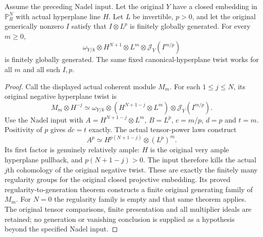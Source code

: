 \begin{proposition}
\label{prop:c0n-ordinary-uniform-generation}
\leanok
{}
Assume the preceding Nadel input.  Let the original $Y$ have a closed
embedding in $\mathbb P^N_R$ with actual hyperplane line $H$.  Let $L$
be invertible, $p>0$, and let the original generically nonzero $I$ satisfy
that $I\otimes L^p$ is finitely globally generated.  For every $m\geq0$,
\[
 \omega_{Y/k}\otimes H^{N+1}\otimes L^m
          \otimes\mathcal J_Y(I^{m/p})
\]
is finitely globally generated.  The same fixed canonical-hyperplane
twist works for all $m$ and all such $I,p$.
\end{proposition}
\begin{proof}
Call the displayed actual coherent module $M_m$.  For each
$1\leq j\leq N$, its original negative hyperplane twist is
\[
 M_m\otimes H^{-j}
  \simeq\omega_{Y/k}\otimes
       (H^{N+1-j}\otimes L^m)\otimes\mathcal J_Y(I^{m/p}).
\]
Use the Nadel input with $A=H^{N+1-j}\otimes L^m$, $B=L^p$,
$c=m/p$, $d=p$ and $t=m$.  Positivity of $p$ gives $dc=t$ exactly.
The actual tensor-power laws construct
\[
 A^p\simeq H^{p(N+1-j)}\otimes (L^p)^m.
\]
Its first factor is genuinely relatively ample: $H$ is the original
very ample hyperplane pullback, and $p(N+1-j)>0$.  The input therefore
kills the actual $j$th cohomology of the original negative twist.
These are exactly the finitely many regularity groups for the original
closed projective embedding.  Its proved regularity-to-generation
theorem constructs a finite original generating family of $M_m$.
For $N=0$ the regularity family is empty and that same theorem applies.
The original tensor comparisons, finite presentation and all multiplier
ideals are retained; no generation or vanishing conclusion is supplied
as a hypothesis beyond the specified Nadel input.
\end{proof}

